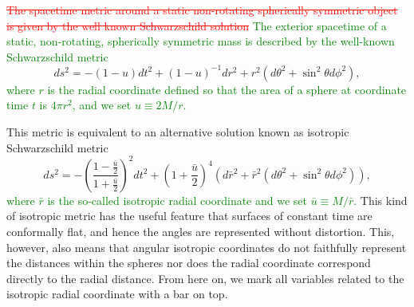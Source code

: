 \documentclass{aa}
\newcommand{\be}{\begin{equation}}
\newcommand{\ee}{\end{equation}}
\newcommand{\refe}[1]{\textcolor{green}{{#1}}}
\newcommand{\refedel}[1]{\textcolor{red}{\sout{#1}}}
\newcommand{\sch}{Schwarzschild }
\newcommand{\rb}{\ensuremath{\bar{r}}}
\newcommand{\ub}{\ensuremath{\bar{u}}}
\begin{document}
\refedel{The spacetime metric around a static non-rotating spherically symmetric object is given by the well known \sch solution}
\refe{ The exterior spacetime of a static, non-rotating, spherically symmetric mass is described by the well-known Schwarzschild metric}
\be
ds^2  = -(1-u) dt^2 + (1-u)^{-1}dr^2+r^2(d\theta^2+\sin^2\theta d\phi^2),
\ee
\refe{where $r$ is the radial coordinate defined so that the area of a sphere at coordinate time $t$ is $4\pi r^2$, and we set $u \equiv 2M/r$.}

This metric is equivalent to an alternative solution known as isotropic \sch metric \citep[see e.g.][]{MTW73}
\be
\label{eq:ISch}
ds^2 = -\left( \frac{1-\frac{\ub}{2}}{1+\frac{\ub}{2}} \right)^2 dt^2 + \left( 1+\frac{\ub}{2} \right)^4(d\rb^2 + \rb^2(d\theta^2+\sin^2\theta d\phi^2)),
\ee
\refe{where $\rb$ is the so-called isotropic radial coordinate and we set $\ub \equiv M/\rb$.}
This kind of isotropic metric has the useful feature that surfaces of constant time are conformally flat, and hence the angles are represented without distortion.
This, however, also means that angular isotropic coordinates do not faithfully represent the distances within the spheres nor does the radial coordinate correspond directly to the radial distance.
From here on, we mark all variables related to the isotropic radial coordinate with a bar on top.
\end{document}
